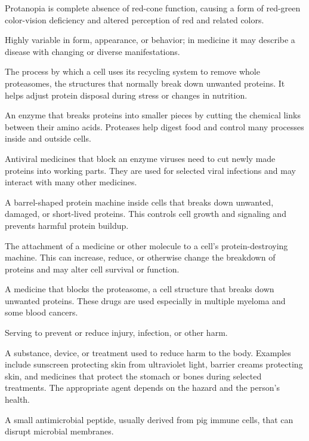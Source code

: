  Protanopia is complete absence of red-cone function, causing a form of red-green color-vision deficiency and altered perception of red and related colors.

 Highly variable in form, appearance, or behavior; in medicine it may describe a disease with changing or diverse manifestations.

 The process by which a cell uses its recycling system to remove whole proteasomes, the structures that normally break down unwanted proteins. It helps adjust protein disposal during stress or changes in nutrition.

 An enzyme that breaks proteins into smaller pieces by cutting the chemical links between their amino acids. Proteases help digest food and control many processes inside and outside cells.

 Antiviral medicines that block an enzyme viruses need to cut newly made proteins into working parts. They are used for selected viral infections and may interact with many other medicines.

 A barrel-shaped protein machine inside cells that breaks down unwanted, damaged, or short-lived proteins. This controls cell growth and signaling and prevents harmful protein buildup.

 The attachment of a medicine or other molecule to a cell’s protein-destroying machine. This can increase, reduce, or otherwise change the breakdown of proteins and may alter cell survival or function.

 A medicine that blocks the proteasome, a cell structure that breaks down unwanted proteins. These drugs are used especially in multiple myeloma and some blood cancers.

 Serving to prevent or reduce injury, infection, or other harm.

 A substance, device, or treatment used to reduce harm to the body. Examples include sunscreen protecting skin from ultraviolet light, barrier creams protecting skin, and medicines that protect the stomach or bones during selected treatments. The appropriate agent depends on the hazard and the person’s health.

 A small antimicrobial peptide, usually derived from pig immune cells, that can disrupt microbial membranes.

